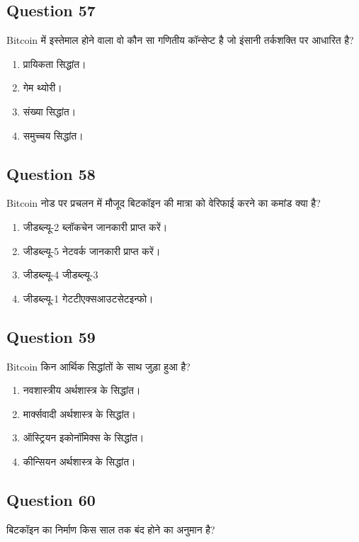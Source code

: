 \documentclass[12pt,a4paper]{article}
\begin{document}
\bigskip


\subsection*{Question 57}
Bitcoin में इस्तेमाल होने वाला वो कौन सा गणितीय कॉन्सेप्ट है जो इंसानी तर्कशक्ति पर आधारित है?

\begin{enumerate}[label=\Alph*., leftmargin=*]
\item प्रायिकता सिद्धांत।
\item गेम थ्योरी।
\item संख्या सिद्धांत।
\item समुच्चय सिद्धांत।
\end{enumerate}

\bigskip


\subsection*{Question 58}
Bitcoin नोड पर प्रचलन में मौजूद बिटकॉइन की मात्रा को वेरिफाई करने का कमांड क्या है?

\begin{enumerate}[label=\Alph*., leftmargin=*]
\item जीडब्ल्यू-2 ब्लॉकचेन जानकारी प्राप्त करें।
\item जीडब्ल्यू-5 नेटवर्क जानकारी प्राप्त करें।
\item जीडब्ल्यू-4 जीडब्ल्यू-3
\item जीडब्ल्यू-1 गेटटीएक्सआउटसेटइन्फो।
\end{enumerate}

\bigskip


\subsection*{Question 59}
Bitcoin किन आर्थिक सिद्धांतों के साथ जुड़ा हुआ है?

\begin{enumerate}[label=\Alph*., leftmargin=*]
\item नवशास्त्रीय अर्थशास्त्र के सिद्धांत।
\item मार्क्सवादी अर्थशास्त्र के सिद्धांत।
\item ऑस्ट्रियन इकोनॉमिक्स के सिद्धांत।
\item कीन्सियन अर्थशास्त्र के सिद्धांत।
\end{enumerate}

\bigskip


\subsection*{Question 60}
बिटकॉइन का निर्माण किस साल तक बंद होने का अनुमान है?
\end{document}

